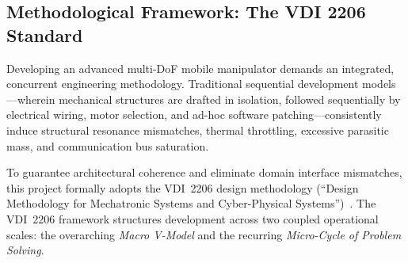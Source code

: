 \subsection{Methodological Framework: The VDI 2206 Standard}
Developing an advanced multi-DoF mobile manipulator demands an integrated, concurrent engineering methodology. Traditional sequential development models---wherein mechanical structures are drafted in isolation, followed sequentially by electrical wiring, motor selection, and ad-hoc software patching---consistently induce structural resonance mismatches, thermal throttling, excessive parasitic mass, and communication bus saturation.

To guarantee architectural coherence and eliminate domain interface mismatches, this project formally adopts the VDI~2206 design methodology (``Design Methodology for Mechatronic Systems and Cyber-Physical Systems'')~\cite{vdi2206}. The VDI~2206 framework structures development across two coupled operational scales: the overarching \emph{Macro V-Model} and the recurring \emph{Micro-Cycle of Problem Solving}.

